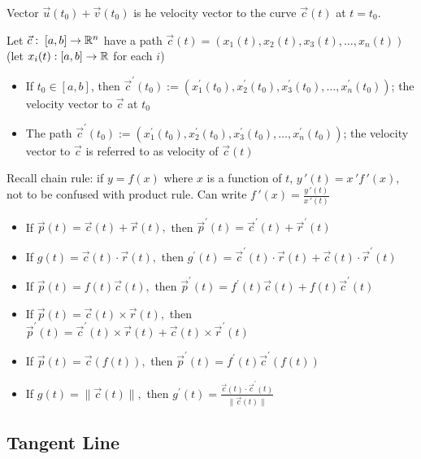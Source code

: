 Vector $\vec{u}(t_0)+\vec{v}(t_0)$ is he velocity vector to the curve $\vec{c}(t)$ at $t=t_0$.\newline

\noindent
Let $\vec{c}:\;[a,b]\rightarrow \mathbb{R}^n$ have a path $\vec{c}(t)=\left(x_{1}(t), x_{2}(t), x_{3}(t), \ldots, x_{n}(t)\right)$ (let $x_i(t):[a,b]\rightarrow \mathbb{R}$ for each $i$)
\begin{itemize}
    \item If $t_0\in[a,b]$, then $\vec{c}^{\prime}\left(t_{0}\right):=\left(x_{1}^{\prime}\left(t_{0}\right), x_{2}^{\prime}\left(t_{0}\right), x_{3}^{\prime}\left(t_{0}\right), \ldots, x_{n}^{\prime}\left(t_{0}\right)\right)$; the velocity vector to $\vec{c}$ at $t_0$
    \item The path $\vec{c}^{\prime}\left(t_{0}\right):=\left(x_{1}^{\prime}\left(t_{0}\right), x_{2}^{\prime}\left(t_{0}\right), x_{3}^{\prime}\left(t_{0}\right), \ldots, x_{n}^{\prime}\left(t_{0}\right)\right)$; the velocity vector to $\vec{c}$ is referred to as velocity of $\vec{c}(t)$
\end{itemize}

Recall chain rule: if $y=f(x)$ where $x$ is a function of $t$, $y\,'(t)=x\,'f\,'(x)$, not to be confused with product rule.
Can write $f\,'(x)=\frac{y\,'(t)}{x\,'(t)}$

\begin{itemize}
    \item If $\vec{p}(t)=\vec{c}(t)+\vec{r}(t),$ then $\vec{p}^{\prime}(t)=\vec{c}^{\prime}(t)+\vec{r}^{\prime}(t)$
    \item If $g(t)=\vec{c}(t) \cdot \vec{r}(t),$ then $g^{\prime}(t)=\vec{c}^{\prime}(t) \cdot \vec{r}(t)+\vec{c}(t) \cdot \vec{r}^{\prime}(t)$
    \item If $\vec{p}(t)=f(t) \vec{c}(t),$ then $\vec{p}^{\prime}(t)=f^{\prime}(t) \vec{c}(t)+f(t) \vec{c}^{\prime}(t)$
    \item If $\vec{p}(t)=\vec{c}(t) \times \vec{r}(t),$ then $\vec{p}^{\prime}(t)=\vec{c}^{\prime}(t) \times \vec{r}(t)+\vec{c}(t) \times \vec{r}^{\prime}(t)$
    \item If $\vec{p}(t)=\vec{c}(f(t)),$ then $\vec{p}^{\prime}(t)=f^{\prime}(t) \vec{c}^{\prime}(f(t))$
    \item If $g(t)=\|\vec{c}(t)\|,$ then $g^{\prime}(t)=\frac{\vec{c}(t) \cdot \vec{c}^{\prime}(t)}{\|\vec{c}(t)\|}$
\end{itemize}

\subsection{Tangent Line}

